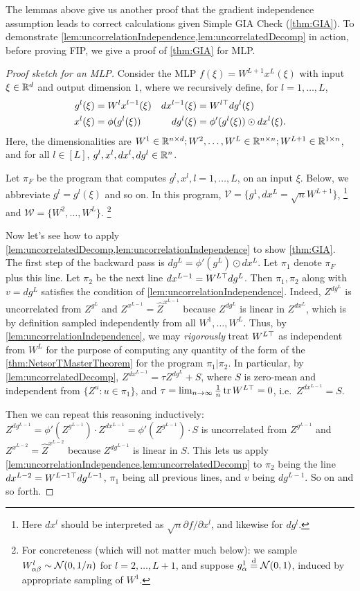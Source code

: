 \documentclass[main.tex]{subfiles}
\begin{document}
The lemmas above give us another proof that the gradient independence assumption leads to correct calculations given Simple GIA Check (\cref{thm:GIA}).
To demonstrate \cref{lem:uncorrelationIndependence,lem:uncorrelatedDecomp} in action, before proving FIP, we give a proof of \cref{thm:GIA} for MLP.
\begin{proof}[Proof sketch for an MLP]
Consider the MLP $f(\xi)=W^{L+1}x^{L}(\xi)$ with input $\xi\in\mathbb{R}^{d}$ and output dimension $1$, where we recursively define, for $l=1,\ldots,L$, 
\begin{align*}
g^{l}(\xi) & =W^{l}x^{l-1}(\xi) & dx^{l-1}(\xi) & =W^{l\top}dg^{l}(\xi) \\
x^{l}(\xi) & =\phi(g^{l}(\xi)) & dg^{l}(\xi) & =\phi'(g^{l}(\xi))\odot dx^{l}(\xi).
\end{align*}
Here, the dimensionalities are $W^1 \in \mathbb{R}^{n \times d}; W^2, \ldots, W^L \in \mathbb{R}^{n \times n}; W^{L+1} \in \mathbb{R}^{1 \times n}$, and for all $l\in[L]$, $g^l, x^l, dx^l, dg^l \in \mathbb{R}^n$.

Let $\pi_{F}$ be the program that computes $g^l, x^l, l=1,\ldots, L$, on an input $\xi$.
Below, we abbreviate $g^l = g^l(\xi)$ and so on.
In this program, $\mathcal V = \{g^1, dx^L = \sqrt n W^{L+1}\}$,
\footnote{
    Here $dx^l$ should be interpreted as $\sqrt n \partial f/\partial x^l$, and likewise for $dg^l$.
}%
and $\mathcal W = \{W^2, \ldots, W^L\}$.%
\footnote{
    For concreteness (which will not matter much below): we sample $W^l_{\alpha\beta} \sim \mathcal{N}(0, 1/n)$ for $l = 2, \ldots, L+1$, and suppose $g^1_\alpha \overset{\mathrm{d}}{=} \mathcal{N}(0, 1)$, induced by appropriate sampling of $W^1$.
}

Now let's see how to apply \cref{lem:uncorrelatedDecomp,lem:uncorrelationIndependence} to show \cref{thm:GIA}.
The first step of the backward pass is $dg^{L}=\phi'(g^{L})\odot dx^{L}$. Let $\pi_{1}$ denote $\pi_{F}$ plus this line. Let $\pi_{2}$ be the next line $dx^{L-1}=W^{L\top}dg^{L}$. Then $\pi_{1},\pi_{2}$ along with $v=dg^{L}$ satisfies the condition of \cref{lem:uncorrelationIndependence}.
Indeed, $Z^{dg^L}$ is uncorrelated from $Z^{g^L}$ and $Z^{x^{L-1}} = \hat Z^{x^{L-1}}$ because $Z^{dg^L}$ is linear in $Z^{dx^L}$, which is by definition sampled independently from all $W^1, \ldots, W^L$.
Thus, by \cref{lem:uncorrelationIndependence}, we may \emph{rigorously} treat $W^{L\top}$ as independent from $W^{L}$ for the purpose of computing any quantity of the form of the \cref{thm:NetsorTMasterTheorem} for the program $\pi_{1}|\pi_{2}$.
In particular, by \cref{lem:uncorrelatedDecomp}, $Z^{dx^{L-1}} = \tau Z^{dg^L} + S$, where $S$ is zero-mean and independent from $\{Z^{u}:u\in\pi_{1}\}$, and $\tau=\lim_{n\to\infty}\frac{1}{n}\operatorname{tr} W^{L\top} = 0$, i.e.\ $Z^{dx^{L-1}} = S$.

Then we can repeat this reasoning inductively: $Z^{dg^{L-1}} = \phi'(Z^{g^{L-1}}) \cdot Z^{dx^{L-1}} = \phi'(Z^{g^{L-1}}) \cdot S$ is uncorrelated from $Z^{g^{L-1}}$ and $Z^{x^{L-2}} = \hat Z^{x^{L-2}}$ because $Z^{dg^{L-1}}$ is linear in $S$.
This lets us apply \cref{lem:uncorrelationIndependence,lem:uncorrelatedDecomp} to $\pi_2$ being the line $dx^{L-2}=W^{L-1\top}dg^{L-1}$, $\pi_1$ being all previous lines, and $v$ being $dg^{L-1}$.
So on and so forth.
\end{proof}
\end{document}
